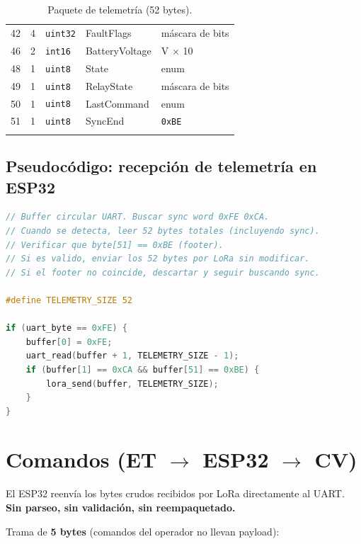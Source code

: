 \documentclass[11pt,a4paper]{article}
\begin{document}
\begin{longtable}{@{}ccllp{4.5cm}@{}}
42 & 4 & \texttt{uint32} & FaultFlags       & máscara de bits \\
46 & 2 & \texttt{int16}  & BatteryVoltage   & V $\times$ 10 \\
48 & 1 & \texttt{uint8}  & State            & enum \\
49 & 1 & \texttt{uint8}  & RelayState       & máscara de bits \\
50 & 1 & \texttt{uint8}  & LastCommand      & enum \\
51 & 1 & \texttt{uint8}  & SyncEnd          & \texttt{0xBE} \\
\bottomrule
\caption{Paquete de telemetría (52 bytes).}
\end{longtable}

\subsection{Pseudocódigo: recepción de telemetría en ESP32}

\begin{lstlisting}[language=C, caption={ESP32: recibir telemetría y reenviar por LoRa.}]
// Buffer circular UART. Buscar sync word 0xFE 0xCA.
// Cuando se detecta, leer 52 bytes totales (incluyendo sync).
// Verificar que byte[51] == 0xBE (footer).
// Si es valido, enviar los 52 bytes por LoRa sin modificar.
// Si el footer no coincide, descartar y seguir buscando sync.

#define TELEMETRY_SIZE 52

if (uart_byte == 0xFE) {
    buffer[0] = 0xFE;
    uart_read(buffer + 1, TELEMETRY_SIZE - 1);
    if (buffer[1] == 0xCA && buffer[51] == 0xBE) {
        lora_send(buffer, TELEMETRY_SIZE);
    }
}
\end{lstlisting}


\section{Comandos (ET $\rightarrow$ ESP32 $\rightarrow$ CV)}

El ESP32 reenvía los bytes crudos recibidos por LoRa directamente al UART. \textbf{Sin parseo, sin validación, sin reempaquetado.}

Trama de \textbf{5 bytes} (comandos del operador no llevan payload):
\end{document}
